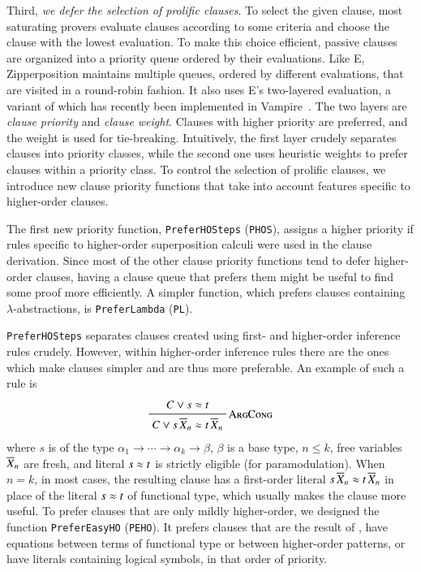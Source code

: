 Third, \emph{we defer the selection of prolific clauses}. To select the given
clause, most saturating provers evaluate clauses according to some criteria and
choose the clause with the lowest evaluation. To make this choice efficient,
passive clauses are organized into a priority queue ordered by their
evaluations. Like E, Zipper\-position maintains multiple
queues, ordered by different evaluations, that are visited in a round-robin
fashion. It also uses E's two-layered evaluation, a variant of which
has recently been implemented in Vampire~\cite{gs-20-clausesel}.
%
The two layers are \emph{clause priority} and \emph{clause weight}. Clauses
with higher priority are preferred, and the weight is used for tie-breaking.
Intuitively, the first layer crudely separates clauses into priority classes,
while the second one uses heuristic weights to prefer clauses within a
priority class. To control the selection of prolific clauses, we introduce new
clause priority functions that take into account features specific to
higher-order clauses.

The first new priority function, \verb|PreferHOSteps| (\verb|PHOS|), assigns a
higher priority if rules specific to higher-order superposition calculi
were used in the clause derivation. Since most of the other clause priority
functions tend to defer higher-order clauses, having a clause queue that prefers
them might be useful to find some proof more
efficiently. A simpler function, which prefers clauses containing
$\lambda$-abstractions, is \verb|PreferLambda| (\verb|PL|).

\verb|PreferHOSteps| separates clauses created using first-
and higher-order inference rules crudely. However, within higher-order
inference rules there are the ones which make clauses simpler and are thus more
preferable. An example of such a rule is
%
\[\namedinference{\infname{ArgCong}}{C \lor s \eq t}{C \lor s \, \tuplen{X}
\eq t \, \tuplen{X}}\]
%
where $s$ is of the type $\alpha_1 \rightarrow \cdots \rightarrow \alpha_k
\rightarrow \beta$, $\beta$ is a base type, $n \leq k$, free variables
$\overline{X}_{n}$ are fresh, and literal $s \approx t$ is strictly eligible (for paramodulation). When $n =
k$, in most cases, the resulting clause has a first-order literal $s \, \overline{X}_{n}
\approx t \, \overline{X}_{n}$ in place of the literal $s \approx t$ of functional type, which usually makes the clause more useful. To
prefer clauses that are only mildly higher-order, we designed the function
\verb|PreferEasyHO| (\verb|PEHO|). It prefers clauses that are the result of
, have equations between terms of functional type or
between higher-order patterns, or have literals containing logical symbols, in that
order of priority.

